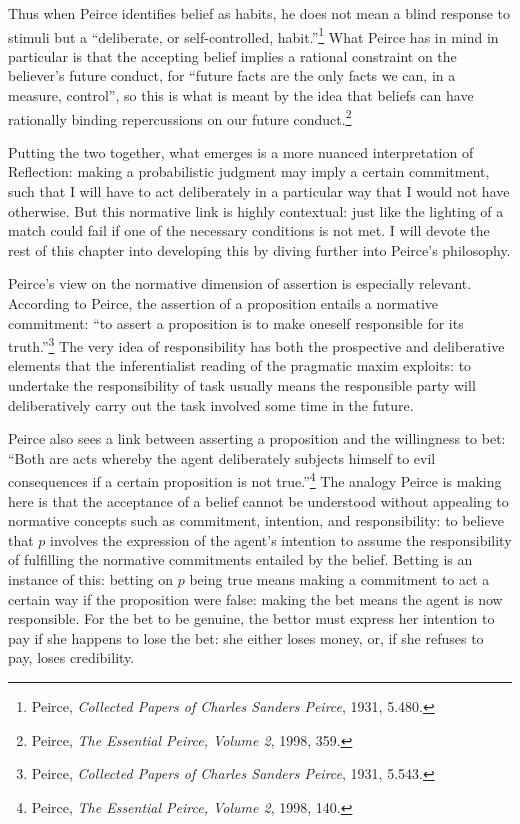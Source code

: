 Thus when Peirce identifies belief as habits, he does not mean a blind
response to stimuli but a ``deliberate, or self-controlled,
habit.''\footnote{Peirce, \emph{Collected Papers of Charles Sanders
  Peirce}, 1931, 5.480.} What Peirce has in mind in particular is that
the accepting belief implies a rational constraint on the believer's
future conduct, for ``future facts are the only facts we can, in a
measure, control'', so this is what is meant by the idea that beliefs
can have rationally binding repercussions on our future
conduct.\footnote{Peirce, \emph{The Essential Peirce, Volume 2}, 1998,
  359.}

Putting the two together, what emerges is a more nuanced interpretation
of Reflection: making a probabilistic judgment may imply a certain
commitment, such that I will have to act deliberately in a particular
way that I would not have otherwise. But this normative link is highly
contextual: just like the lighting of a match could fail if one of the
necessary conditions is not met. I will devote the rest of this chapter
into developing this by diving further into Peirce's philosophy.

Peirce's view on the normative dimension of assertion is especially
relevant. According to Peirce, the assertion of a proposition entails a
normative commitment: ``to assert a proposition is to make oneself
responsible for its truth.''\footnote{Peirce, \emph{Collected Papers of
  Charles Sanders Peirce}, 1931, 5.543.} The very idea of responsibility
has both the prospective and deliberative elements that the
inferentialist reading of the pragmatic maxim exploits: to undertake the
responsibility of task usually means the responsible party will
deliberatively carry out the task involved some time in the future.

Peirce also sees a link between asserting a proposition and the
willingness to bet: ``Both are acts whereby the agent deliberately
subjects himself to evil consequences if a certain proposition is not
true.''\footnote{Peirce, \emph{The Essential Peirce, Volume 2}, 1998,
  140.} The analogy Peirce is making here is that the acceptance of a
belief cannot be understood without appealing to normative concepts such
as commitment, intention, and responsibility: to believe that \(p\)
involves the expression of the agent's intention to assume the
responsibility of fulfilling the normative commitments entailed by the
belief. Betting is an instance of this: betting on \(p\) being true
means making a commitment to act a certain way if the proposition were
false: making the bet means the agent is now responsible. For the bet to
be genuine, the bettor must express her intention to pay if she happens
to lose the bet: she either loses money, or, if she refuses to pay,
loses credibility.

